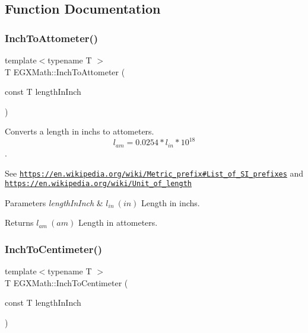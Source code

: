 \subsection{Function Documentation}
\mbox{\label{group___e_g_x_math-_conversions-_length_conversions-_imperial-_inch-_s_i_ga884865df95828abbf92a65e2ad67538a}} 
\subsubsection{\texorpdfstring{Inch\+To\+Attometer()}{InchToAttometer()}}
{\footnotesize\ttfamily template$<$typename T $>$ \\
T E\+G\+X\+Math\+::\+Inch\+To\+Attometer (\begin{DoxyParamCaption}\item[{const T}]{length\+In\+Inch }\end{DoxyParamCaption})}



Converts a length in inchs to attometers. \[ l_{am}=0.0254 * l_{in} * 10^{18} \]. 

See \href{https://en.wikipedia.org/wiki/Metric_prefix#List_of_SI_prefixes}{\tt https\+://en.\+wikipedia.\+org/wiki/\+Metric\+\_\+prefix\#\+List\+\_\+of\+\_\+\+S\+I\+\_\+prefixes} and \href{https://en.wikipedia.org/wiki/Unit_of_length}{\tt https\+://en.\+wikipedia.\+org/wiki/\+Unit\+\_\+of\+\_\+length} 
\begin{DoxyParams}{Parameters}
{\em length\+In\+Inch} & $ l_{in}\ (in)$ Length in inchs. \\
\hline
\end{DoxyParams}
\begin{DoxyReturn}{Returns}
$ l_{am}\ (am)$ Length in attometers. 
\end{DoxyReturn}
\mbox{\label{group___e_g_x_math-_conversions-_length_conversions-_imperial-_inch-_s_i_ga1a0fb189a0eb34f55a021d8372191f8e}} 
\subsubsection{\texorpdfstring{Inch\+To\+Centimeter()}{InchToCentimeter()}}
{\footnotesize\ttfamily template$<$typename T $>$ \\
T E\+G\+X\+Math\+::\+Inch\+To\+Centimeter (\begin{DoxyParamCaption}\item[{const T}]{length\+In\+Inch }\end{DoxyParamCaption})}



